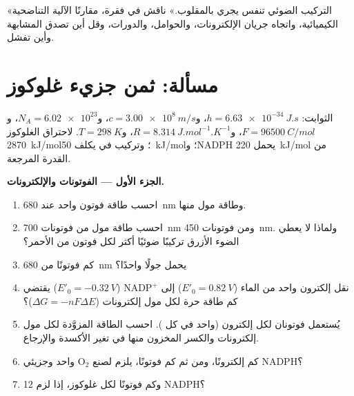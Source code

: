\begin{exercise}[$\star\star\star$]\label{exo:b1:photosynthesis:12}
«التركيب الضوئي تنفس يجري بالمقلوب.» ناقش في فقرة، مقارنًا الآلية
التناضحية الكيميائية، واتجاه جريان الإلكترونات، والحوامل، والدورات،
وقل أين تصدق المشابهة وأين تفشل.
\end{exercise}

\section{مسألة: ثمن جزيء غلوكوز}

\begin{problem}
\label{pb:b1:photosynthesis:1}
الثوابت: $h = \qty{6.63e-34}{J.s}$، و$c = \qty{3.00e8}{m/s}$،
و$N_A = \num{6.02e23}$، و$F = \qty{96500}{C/mol}$، و$R = \qty{8.314}{J.mol^{-1}.K^{-1}}$،
و$T = \qty{298}{K}$.  لاحتراق الغلوكوز
\qty{2870}{kJ/mol}؛ وتركيب  في  يكلف
\qty{50}{kJ/mol}؛ وNADPH يحمل \qty{220}{kJ/mol} من القدرة المرجعة.

\medskip
\noindent\textbf{الجزء الأول --- الفوتونات والإلكترونات.}
\begin{enumerate}
  \item احسب طاقة فوتون واحد عند \qty{680}{nm} وطاقة مول منها.
  \item احسب طاقة مول من فوتونات \qty{700}{nm} ومن فوتونات
        \qty{450}{nm}. ولماذا لا يعطي الضوء الأزرق تركيبًا ضوئيًا
        أكثر لكل فوتون من الأحمر؟
  \item كم فوتونًا من \qty{680}{nm} يحمل جولًا واحدًا؟
  \item نقل إلكترون واحد من الماء ($E'_0 = \qty{+0.82}{V}$) إلى
        $\mathrm{NADP^+}$ ($E'_0 = \qty{-0.32}{V}$) يقتضي كم طاقة حرة
        لكل مول إلكترونات ($\Delta G = -nF\Delta E$)؟
  \item يُستعمل فوتونان لكل إلكترون (واحد في كل ). احسب
        الطاقة المزوَّدة لكل مول إلكترونات والكسر المخزون منها في تغير
        الأكسدة والإرجاع.
  \item كم إلكترونًا، ومن ثم كم فوتونًا، يلزم لصنع $\mathrm{O_2}$
        واحد وجزيئي NADPH؟
  \item وكم فوتونًا لكل غلوكوز، إذا لزم 12 NADPH؟
\end{enumerate}


\end{problem}
